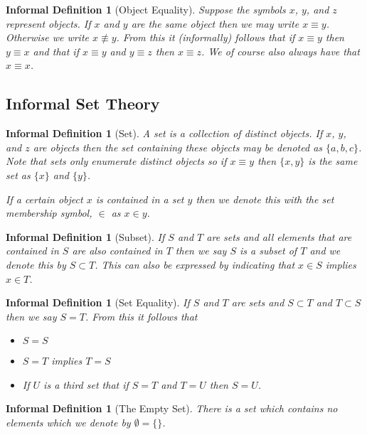 \documentclass[12pt]{article}
\theoremstyle{break}
\theoremstyle{break}
\theoremstyle{break}
\theoremstyle{break}
\theoremstyle{break}
\newtheorem{informal definition}[definition]{Informal Definition}
\theoremstyle{break}
\newtheorem{informal theorem}[theorem]{Informal Theorem}
\begin{document}
	\begin{informal definition}[Object Equality]
		Suppose the symbols $x$, $y$, and $z$ represent objects.
		If $x$ and $y$ are the same object then we may write $x \equiv y$. Otherwise we write $x\not \equiv y$.
		From this it (informally) follows that if $x\equiv y$ then $y \equiv x$ and that if $x \equiv y$ and $y \equiv z$ then $x \equiv z$.
		We of course also always have that $x \equiv x$.
	\end{informal definition}
	
	
	\subsection{Informal Set Theory}
	
	\begin{informal definition}[Set]
		A set is a collection of distinct objects.
		If $x$, $y$, and $z$ are objects then the set containing these objects may be denoted as $\{a, b, c\}$.
		Note that sets only enumerate distinct objects so if $x\equiv y$ then $\{x, y\}$ is the same set as $\{x\}$ and $\{y\}$.
		
		If a certain object $x$ is contained in a set $y$ then we denote this with the set membership symbol, $\in$ as $x \in y$.
	\end{informal definition}
	
	\begin{informal definition}[Subset]
		If $S$ and $T$ are sets and all elements that are contained in $S$ are also contained in $T$ then we say $S$ is a subset of $T$ and we denote this by $S \subset T$.
		This can also be expressed by indicating that $x\in S$ implies $x \in T$.
	\end{informal definition}
	
	\begin{informal definition}[Set Equality]
		If $S$ and $T$ are sets and $S\subset T$ and $T\subset S$ then we say $S=T$.
		From this it follows that
		\begin{itemize}
			\item{$S=S$}
			\item{$S=T$ implies $T=S$}
			\item{If $U$ is a third set that if $S=T$ and $T=U$ then $S=U$.}
		\end{itemize}
	\end{informal definition}
	
	\begin{informal definition}[The Empty Set]
		There is a set which contains no elements which we denote by $\emptyset = \{\}$.
	\end{informal definition}
	
\end{document}
